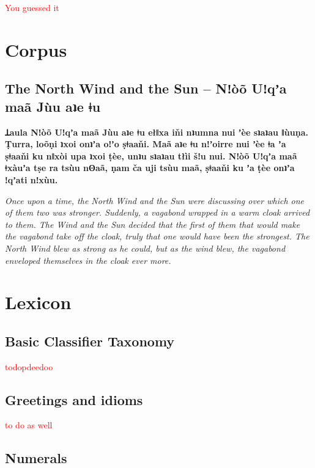 \documentclass[11pt]{book}
\newcommand{\qcn}[1]{\textbf{#1}}
\newcommand{\cmnt}[1]{\textcolor{red}{#1}}
\begin{document}
\cmnt{You guessed it}

\chapter{Corpus}

\section{The North Wind and the Sun -- \qcn{Nǃòõ Uǃqʼa maã Jùu aʇe ǂu}}

\newcommand{\prose}[1]{\begin{center}\begin{minipage}{0.6\textwidth}\large #1\end{minipage}\end{center}}

\prose{\qcn{Ʇaula Nǃòõ Uǃqʼa maã Jùu aʇe ǂu ełǁxa iňi
nʇumna nui ʼèe sʇaʇau ǁùuṇa.
Ṭurra, loõṇi ʇxoi onʇʼa oǃʼo ṣǂaaňi.
Maã aʇe ǂu nǃʼoirre nui ʼèe ǂa ʼa ṣǂaaňi ku nǁxòi upa ʇxoi ṭèe,
unʇu sʇaʇau tłìi šǃu nui.
Nǃòõ Uǃqʼa maã ǂxàuʼa tṣe ra tsùu nʘaã,
ṇam ča uji tsùu maã, ṣǂaaňi ku ʼa ṭèe onʇʼa ǃqʼati nǃxùu.}}

\prose{\emph{Once upon a time, the North Wind and the Sun were discussing over which one of them two was stronger. Suddenly, a vagabond wrapped in a warm cloak arrived to them.  The Wind and the Sun decided that the first of them that would make the vagabond take off the cloak, truly that one would have been the strongest.  The North Wind blew as strong as he could, but as the wind blew, the vagabond enveloped themselves in the cloak ever more.}}



\chapter{Lexicon}

\section{Basic Classifier Taxonomy}

\cmnt{todopdeedoo}

\section{Greetings and idioms}

\cmnt{to do as well}

\section{Numerals}
\end{document}
